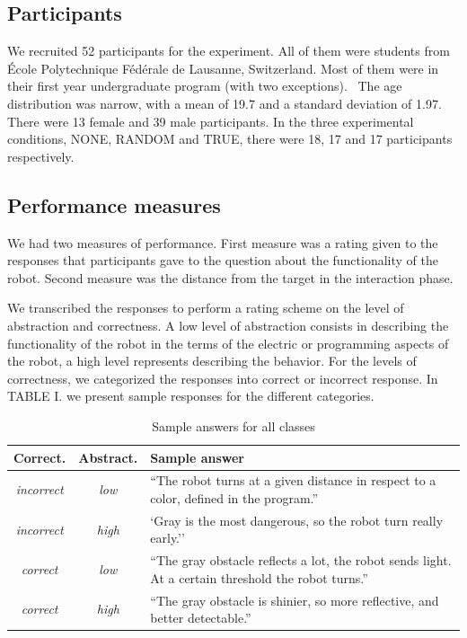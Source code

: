 \documentclass{sig-alternate}
\begin{document}
\subsection{Participants}

We recruited 52 participants for the experiment. All of them were
students from École Polytechnique Fédérale de Lausanne, Switzerland.
Most of them were in their first year undergraduate program (with two
exceptions). ~The age distribution was narrow, with a mean of 19.7 and a
standard deviation of 1.97. There were 13 female and 39 male
participants. In the three experimental conditions, NONE, RANDOM and
TRUE, there were 18, 17 and 17 participants respectively.

\subsection{Performance measures}

We had two measures of performance. First measure was a rating given to
the responses that participants gave to the question about the
functionality of the robot. Second measure was the distance from the
target in the interaction phase.

We transcribed the responses to perform a rating scheme on the level of
abstraction and correctness. A low level of abstraction consists in
describing the functionality of the robot in the terms of the electric
or programming aspects of the robot, a high level represents describing
the behavior. For the levels of correctness, we categorized the
responses into correct or incorrect response. In TABLE I. we present
sample responses for the different categories.

\begin{table}[ht!]
    \centering
    \footnotesize
    \begin{tabular}{ccp{4.5cm}}
        \toprule
        Correct. & Abstract. & Sample answer \\
        \midrule
        \textit{incorrect} & \textit{low} & ``The robot turns at a given distance in respect to a color, defined in the program.''\\ 
        \midrule
        \textit{incorrect} & \textit{high} & `Gray is the most dangerous, so the
        robot turn really early.''\\ 
        \midrule
        \textit{correct} & \textit{low} & ``The gray obstacle reflects a lot,
        the robot sends light. At a certain threshold the robot turns.'' \\ 
        \midrule
        \textit{correct} & \textit{high} & ``The gray obstacle is shinier, so
        more reflective, and better detectable.''\\ 
        \bottomrule
    \end{tabular}
    \caption{Sample answers for all classes}

    \label{sample_answer}
\end{table}
\end{document}

